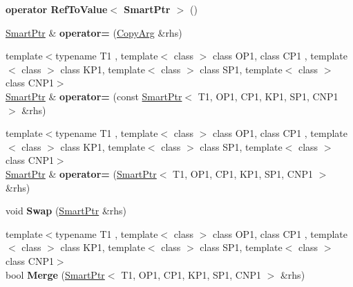 \begin{DoxyCompactItemize}
\item 
\hypertarget{classLoki_1_1SmartPtr_a56ec04b9b27019f880b872a257b9917a}{}{\bfseries operator Ref\+To\+Value$<$ Smart\+Ptr $>$} ()\label{classLoki_1_1SmartPtr_a56ec04b9b27019f880b872a257b9917a}

\item 
\hypertarget{classLoki_1_1SmartPtr_af1ae0026dde20f60d7c1a166a5510988}{}\hyperlink{classLoki_1_1SmartPtr}{Smart\+Ptr} \& {\bfseries operator=} (\hyperlink{structP1}{Copy\+Arg} \&rhs)\label{classLoki_1_1SmartPtr_af1ae0026dde20f60d7c1a166a5510988}

\item 
\hypertarget{classLoki_1_1SmartPtr_ae4a839b8d070150ff5c7e2d1cb3e9259}{}{\footnotesize template$<$typename T1 , template$<$ class $>$ class O\+P1, class C\+P1 , template$<$ class $>$ class K\+P1, template$<$ class $>$ class S\+P1, template$<$ class $>$ class C\+N\+P1$>$ }\\\hyperlink{classLoki_1_1SmartPtr}{Smart\+Ptr} \& {\bfseries operator=} (const \hyperlink{classLoki_1_1SmartPtr}{Smart\+Ptr}$<$ T1, O\+P1, C\+P1, K\+P1, S\+P1, C\+N\+P1 $>$ \&rhs)\label{classLoki_1_1SmartPtr_ae4a839b8d070150ff5c7e2d1cb3e9259}

\item 
\hypertarget{classLoki_1_1SmartPtr_a5226a31f9cfd2ff47f45f7ac2c8bf490}{}{\footnotesize template$<$typename T1 , template$<$ class $>$ class O\+P1, class C\+P1 , template$<$ class $>$ class K\+P1, template$<$ class $>$ class S\+P1, template$<$ class $>$ class C\+N\+P1$>$ }\\\hyperlink{classLoki_1_1SmartPtr}{Smart\+Ptr} \& {\bfseries operator=} (\hyperlink{classLoki_1_1SmartPtr}{Smart\+Ptr}$<$ T1, O\+P1, C\+P1, K\+P1, S\+P1, C\+N\+P1 $>$ \&rhs)\label{classLoki_1_1SmartPtr_a5226a31f9cfd2ff47f45f7ac2c8bf490}

\item 
\hypertarget{classLoki_1_1SmartPtr_a5034856df3e636d3847e4b1813418931}{}void {\bfseries Swap} (\hyperlink{classLoki_1_1SmartPtr}{Smart\+Ptr} \&rhs)\label{classLoki_1_1SmartPtr_a5034856df3e636d3847e4b1813418931}

\item 
\hypertarget{classLoki_1_1SmartPtr_a21530058c74cdba8f1884063cc03ded0}{}{\footnotesize template$<$typename T1 , template$<$ class $>$ class O\+P1, class C\+P1 , template$<$ class $>$ class K\+P1, template$<$ class $>$ class S\+P1, template$<$ class $>$ class C\+N\+P1$>$ }\\bool {\bfseries Merge} (\hyperlink{classLoki_1_1SmartPtr}{Smart\+Ptr}$<$ T1, O\+P1, C\+P1, K\+P1, S\+P1, C\+N\+P1 $>$ \&rhs)\label{classLoki_1_1SmartPtr_a21530058c74cdba8f1884063cc03ded0}


\end{DoxyCompactItemize}
